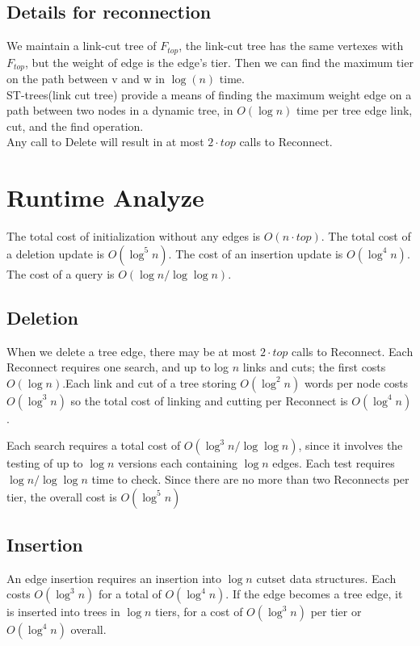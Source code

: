 \documentclass[conference,compsoc]{IEEEtran}
\begin{document}
\subsection{Details for reconnection}
We maintain a link-cut tree of $F_{top}$, the link-cut tree has the same vertexes with $F_{top}$, but the weight of edge is the edge's tier.
Then we can find the maximum tier on the path between v and w in $\log(n)$ time.\\
ST-trees(link cut tree) provide a means of finding the maximum weight edge on a path between two nodes in a dynamic tree, in $O(\log n)$ time per tree edge link, cut, and the find operation.\\
Any call to Delete will result in at most $2 \cdot top$ calls to Reconnect.

\section{Runtime Analyze}
The total cost of initialization without any edges is $O(n\cdot top)$. The total cost of a deletion update is $O(\log^5 n)$. The cost of an insertion update is $O(\log^4 n)$. The cost of a query is $O(\log n/ \log \log n)$.\\

\subsection{Deletion}
When we delete a tree edge, there may be at most $2 \cdot top$ calls to Reconnect. Each Reconnect requires one search, and up to log $n$ links and cuts; the first costs $O(\log n)$.Each link and cut of a tree storing $O(\log^2 n)$ words per node costs $O(\log^3 n)$ so the total cost of linking and cutting per Reconnect is $O(\log^4 n)$.

Each search requires a total cost of $O(\log^3 n/ \log \log n)$, since it involves the testing of up to $\log n$ versions each containing $\log n$ edges. Each test requires $\log n/ \log \log n$ time to check. Since there are no more than two Reconnects per tier, the overall cost is $O(\log^5 n)$

\subsection{Insertion}
An edge insertion requires an insertion into $\log n$ cutset data structures. Each costs $O(\log^3 n)$ for a total of $O(\log^4 n)$. If the edge becomes a tree edge, it is inserted into trees in $\log n$ tiers, for a cost of $O(\log^3 n)$ per tier or $O(\log^4 n)$ overall.
\end{document}
